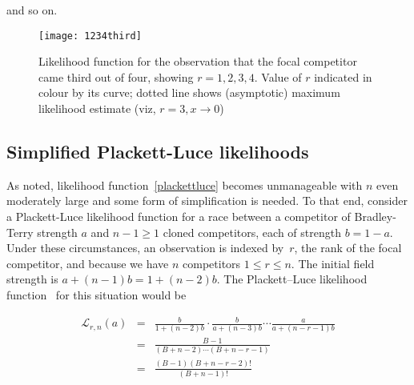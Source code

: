 \documentclass[article]{ajs}
\begin{document}

and so on.


\begin{figure}[t]
  \begin{centering}
\texttt{[image: 1234third]}  %
\caption{Likelihood function for the observation that the focal
  competitor came third out of four, showing
  $r=1,2,3,4$\label{1234third}.  Value of $r$ indicated in colour by
  its curve; dotted line shows (asymptotic) maximum likelihood
  estimate (viz, $r=3, x\longrightarrow 0$)}
\end{centering}
\end{figure}



\subsection{Simplified Plackett-Luce likelihoods}

As noted, likelihood function~\ref{plackettluce} becomes unmanageable
with $n$ even moderately large and some form of simplification is
needed.  To that end, consider a Plackett-Luce likelihood function for
a race between a competitor of Bradley-Terry strength $a$ and
$n-1\geqslant 1$ cloned competitors, each of strength $b=1-a$.  Under
these circumstances, an observation is indexed by~$r$, the rank of the
focal competitor, and because we have $n$ competitors $1\leqslant
r\leqslant n$.  The initial field strength is $a+(n-1)b=1+(n-2)b$.  The
Plackett--Luce likelihood function~\citep{luce1959,plackett1975} for
this situation would be

\begin{eqnarray}\label{likeforrn1}
  \mathcal{L}_{r,n}(a) &=&
\frac{b}{1+ (n-2)b}\cdot
\frac{b}{a+(n-3)b}\cdots\frac{a}{a+(n-r-1)b}\nonumber\\
&=& \frac{B-1}{(B+n-2)\cdots(B+n-r-1)}\nonumber\\ 
&=& \frac{(B-1)(B+n-r-2)!}{(B+n-1)!}\label{likeforrn3}
\end{eqnarray}
\end{document}
